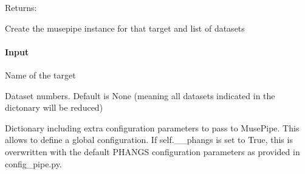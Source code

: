 \documentclass[letterpaper,10pt,english]{sphinxmanual}
\begin{document}
\begin{fulllineitems}
\begin{fulllineitems}
\begin{quote}
\begin{description}
\begin{itemize}
\end{itemize}

\end{description}\end{quote}

\sphinxAtStartPar
Returns:

\end{fulllineitems}


\begin{fulllineitems}
\label{\detokenize{api/pymusepipe:pymusepipe.target_sample.MusePipeSample.set_pipe_target}}
\pysigstartsignatures
{}
\pysigstopsignatures
\sphinxAtStartPar
Create the musepipe instance for that target and list of datasets


\paragraph{Input}
\label{\detokenize{api/pymusepipe:id118}}\begin{description}
\sphinxAtStartPar
Name of the target

\sphinxAtStartPar
Dataset numbers. Default is None (meaning all datasets
indicated in the dictonary will be reduced)

\sphinxAtStartPar
Dictionary including extra configuration parameters to pass
to MusePipe. This allows to define a global configuration.
If self.\_\_phangs is set to True, this is overwritten with the default
PHANGS configuration parameters as provided in config\_pipe.py.

\end{description}

\end{fulllineitems}


\end{fulllineitems}

\end{document}
